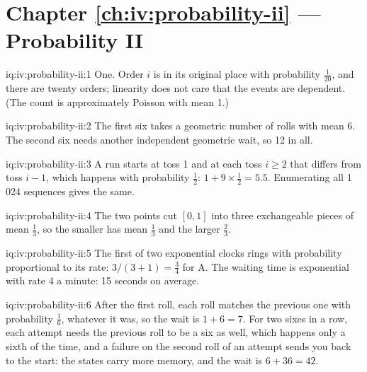 \section*{Chapter \ref{ch:iv:probability-ii} --- Probability II}

\begin{solution}{iq:iv:probability-ii:1}
One. Order $i$ is in its original place with probability $\tfrac1{20}$, and there are twenty orders; linearity
does not care that the events are dependent. (The count is approximately Poisson with mean 1.)
\end{solution}

\begin{solution}{iq:iv:probability-ii:2}
The first six takes a geometric number of rolls with mean 6. The second six needs another independent geometric
wait, so 12 in all.
\end{solution}

\begin{solution}{iq:iv:probability-ii:3}
A run starts at toss 1 and at each toss $i \ge 2$ that differs from toss $i-1$, which happens with probability
$\tfrac12$: $1 + 9 \times \tfrac12 = 5.5$. Enumerating all 1\,024 sequences gives the same.
\end{solution}

\begin{solution}{iq:iv:probability-ii:4}
The two points cut $[0,1]$ into three exchangeable pieces of mean $\tfrac13$, so the smaller has mean $\tfrac13$ and
the larger $\tfrac23$.
\end{solution}

\begin{solution}{iq:iv:probability-ii:5}
The first of two exponential clocks rings with probability proportional to its rate: $3/(3+1) = \tfrac34$ for A.
The waiting time is exponential with rate 4 a minute: 15 seconds on average.
\end{solution}

\begin{solution}{iq:iv:probability-ii:6}
After the first roll, each roll matches the previous one with probability $\tfrac16$, whatever it was, so the
wait is $1 + 6 = 7$. For two sixes in a row, each attempt needs the previous roll to be a six as well, which
happens only a sixth of the time, and a failure on the second roll of an attempt sends you back to the start:
the states carry more memory, and the wait is $6 + 36 = 42$.
\end{solution}

